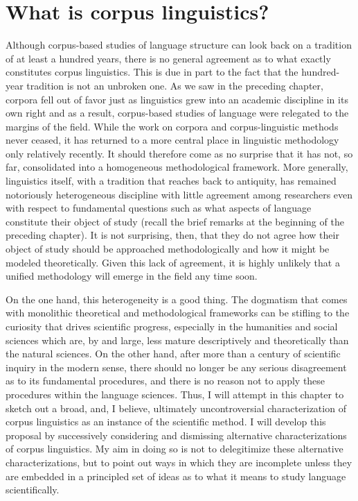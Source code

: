 \chapter{What is corpus linguistics?}
\label{ch:corpuslinguistics}

Although corpus\hyp{}based studies of language structure can look back on a tradition of at least a hundred years, there is no general agreement as to what exactly constitutes corpus linguistics. This is due in part to the fact that the hundred\hyp{}year tradition is not an unbroken one. As we saw in the preceding chapter, corpora fell out of favor just as linguistics grew into an academic discipline in its own right and as a result, corpus\hyp{}based studies of language were relegated to the margins of the field. While the work on corpora and corpus\hyp{}linguistic methods never ceased, it has returned to a more central place in linguistic methodology only relatively recently. It should therefore come as no surprise that it has not, so far, consolidated into a homogeneous methodological framework. More generally, linguistics itself, with a tradition that reaches back to antiquity, has remained notoriously heterogeneous discipline with little agreement among researchers even with respect to fundamental questions such as what aspects of language constitute their object of study (recall the brief remarks at the beginning of the preceding chapter). It is not surprising, then, that they do not agree how their object of study should be approached methodologically and how it might be modeled theoretically. Given this lack of agreement, it is highly unlikely that a unified methodology will emerge in the field any time soon.

On the one hand, this heterogeneity is a good thing. The dogmatism that comes with monolithic theoretical and methodological frameworks can be stifling to the curiosity that drives scientific progress, especially in the humanities  and social sciences which are, by and large, less mature descriptively  and theoretically than the natural sciences. On the other hand, after more than a century of scientific inquiry in the modern sense, there should no longer be any serious disagreement as to its fundamental procedures, and there is no reason not to apply these procedures within the language sciences. Thus, I will attempt in this chapter to sketch out a broad, and, I believe, ultimately uncontroversial characterization of corpus linguistics as an instance of the scientific method. I will develop this proposal by successively considering and dismissing alternative characterizations of corpus linguistics. My aim in doing so is not to delegitimize these alternative characterizations, but to point out ways in which they are incomplete unless they are embedded in a principled set of ideas as to what it means to study language scientifically.


